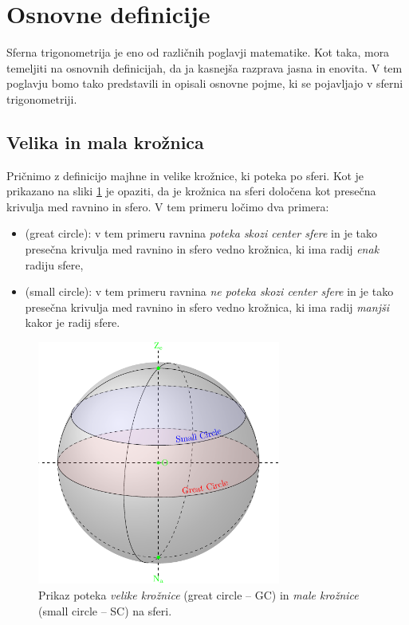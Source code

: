 \section{Osnovne definicije}

Sferna trigonometrija je eno od različnih poglavji matematike. Kot taka, mora temeljiti na osnovnih definicijah, da ja kasnejša razprava jasna in enovita. V tem poglavju bomo tako predstavili in opisali osnovne pojme, ki se pojavljajo v sferni trigonometriji.

\subsection{Velika in mala krožnica}

Pričnimo z definicijo majhne in velike krožnice, ki poteka po sferi. Kot je prikazano na sliki \ref{fig:02-02-small_great_circle} je opaziti, da je krožnica na sferi določena kot presečna krivulja med ravnino in sfero. V tem primeru ločimo dva primera:

\begin{itemize}
	\item {} (great circle): v tem primeru ravnina \emph{poteka skozi center sfere} in je tako presečna krivulja med ravnino in sfero vedno krožnica, ki ima radij \emph{enak} radiju sfere,
	\item {} (small circle): v tem primeru ravnina \emph{ne poteka skozi center sfere} in je tako presečna krivulja med ravnino in sfero vedno krožnica, ki ima radij \emph{manjši} kakor je radij sfere. 
\end{itemize}

\begin{figure}[!htpbp]
	\begin{center}
		\includegraphics[width=80mm]{02_st/figs/fig_02_03-small_great_circle.pdf}
	\end{center}
	\caption{Prikaz poteka \textit{velike krožnice} (great circle -- GC) in \textit{male krožnice} (small circle -- SC) na sferi.}
	\label{fig:02-02-small_great_circle}
\end{figure}

